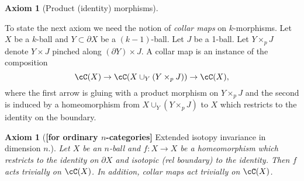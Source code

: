 \documentclass{pnastwo}
\def\bd{\partial}
\newtheorem{axiom}[prop]{Axiom}
\begin{document}
\begin{article}
\begin{axiom}[Product (identity) morphisms]
\end{axiom}

To state the next axiom we need the notion of {\it collar maps} on $k$-morphisms.
Let $X$ be a $k$-ball and $Y\subset\bd X$ be a $(k{-}1)$-ball.
Let $J$ be a 1-ball.
Let $Y\times_p J$ denote $Y\times J$ pinched along $(\bd Y)\times J$.
A collar map is an instance of the composition
\[
	\cC(X) \to \cC(X\cup_Y (Y\times_p J)) \to \cC(X) ,
\]
where the first arrow is gluing with a product morphism on $Y\times_p J$ and
the second is induced by a homeomorphism from $X\cup_Y (Y\times_p J)$ to $X$ which restricts
to the identity on the boundary.


\begin{axiom}[\textup{\textbf{[for ordinary  $n$-categories]}} Extended isotopy invariance in dimension $n$.]
\label{axiom:extended-isotopies}
Let $X$ be an $n$-ball and $f: X\to X$ be a homeomorphism which restricts
to the identity on $\bd X$ and isotopic (rel boundary) to the identity.
Then $f$ acts trivially on $\cC(X)$.
In addition, collar maps act trivially on $\cC(X)$.
\end{axiom}


\end{article}
\end{document}
